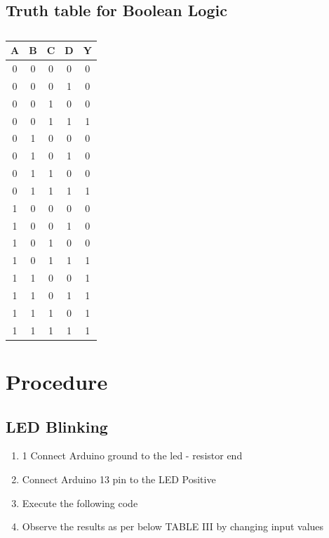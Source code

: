 \documentclass[journal,12pt,twocolumn]{IEEEtran}
\begin{document}
\subsection{Truth table for Boolean Logic}
\begin{table}[!h]
\begin{tabular}{|c|c|c|c|c|}
\hline
\centering
A & B & C & D & Y \\ 
\hline 
0 & 0 & 0 & 0 & 0\\
0 & 0 & 0 & 1 & 0\\
0 & 0 & 1 & 0 & 0\\
0 & 0 & 1 & 1 & 1\\
0 & 1 & 0 & 0 & 0\\
0 & 1 & 0 & 1 & 0\\
0 & 1 & 1 & 0 & 0\\
0 & 1 & 1 & 1 & 1\\
1 & 0 & 0 & 0 & 0\\
1 & 0 & 0 & 1 & 0\\
1 & 0 & 1 & 0 & 0\\
1 & 0 & 1 & 1 & 1\\
1 & 1 & 0 & 0 & 1\\
1 & 1 & 0 & 1 & 1\\
1 & 1 & 1 & 0 & 1\\
1 & 1 & 1 & 1 & 1\\
\hline
\end{tabular}
\centering 
\label{Truth table}
\caption{}

\end{table}


\section{Procedure}
\subsection{LED Blinking}
\begin{enumerate}
\item 1 Connect Arduino ground to the led - resistor end
\item Connect Arduino 13 pin to the LED Positive
\item Execute the following code
\item Observe the results as per below TABLE III by changing input values
\end{enumerate}
\end{document}
